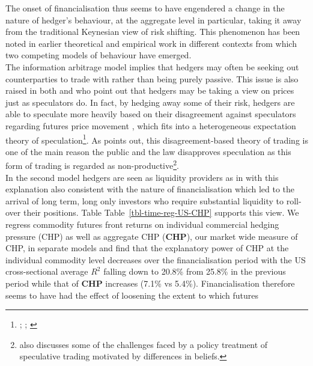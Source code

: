 \documentclass[
  authoryear,
  preprint,
  3p]{elsarticle}
\begin{document}
\medskip

The onset of financialisation thus seems to have engendered a change in
the nature of hedger's behaviour, at the aggregate level in particular,
taking it away from the traditional Keynesian view of risk shifting.
This phenomenon has been noted in earlier theoretical and empirical work
\citep{danthine_information_1978, stout_why_1998} in different contexts
from which two competing models of behaviour have emerged.\\
The information arbitrage model
\citep{grossman_impossibility_1980, danthine_information_1978, kyle_informed_1989}
implies that hedgers may often be seeking out counterparties to trade
with rather than being purely passive. This issue is also raised in both
\citet{cheng_financialisation_2014} and \citet{stulz_rethink_1996} who
point out that hedgers may be taking a view on prices just as
speculators do. In fact, by hedging away some of their risk, hedgers are
able to speculate more heavily based on their disagreement against
speculators regarding futures price movement
\citep{simsek_speculation_2013}, which fits into a heterogeneous
expectation theory of speculation\footnote{\citet{hirshleifer_speculation_1975};
  \citet{hirshleifer_reply_1976}; \citet{hirshleifer_theory_1977}}. As
\citet{stout_why_1998} points out, this disagreement-based theory of
trading is one of the main reason the public and the law disapproves
speculation as this form of trading is regarded as
non-productive\footnote{\citet{duffie_challenges_2014} also discusses
  some of the challenges faced by a policy treatment of speculative
  trading motivated by differences in beliefs.}.\\
In the second model hedgers are seen as liquidity providers as in
\citet{kang_tale_2020} with this explanation also consistent with the
nature of financialisation which led to the arrival of long term, long
only investors who require substantial liquidity to roll-over their
positions. Table Table~\ref{tbl-time-reg-US-CHP} supports this view. We
regress commodity futures front returns on individual commercial hedging
pressure (CHP) as well as aggregate CHP (\textbf{CHP}), our market wide
measure of CHP, in separate models and find that the explanatory power
of CHP at the individual commodity level decreases over the
financialisation period with the US cross-sectional average \(R^{2}\)
falling down to 20.8\% from 25.8\% in the previous period while that of
\textbf{CHP} increases (7.1\% vs 5.4\%). Financialisation therefore
seems to have had the effect of loosening the extent to which futures
\end{document}
